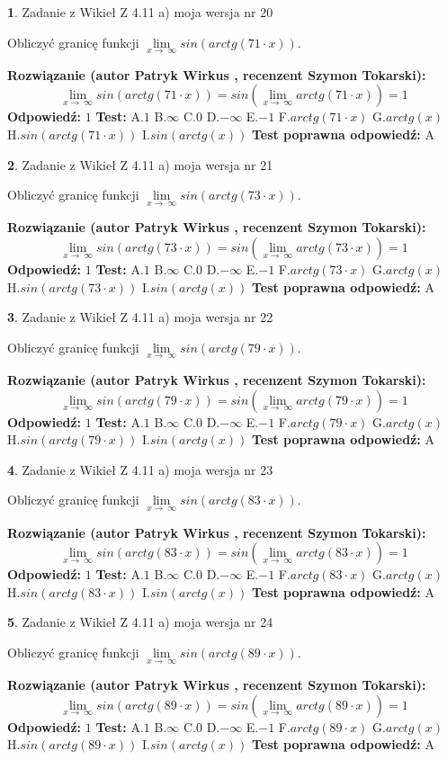 \documentclass[12pt, a4paper]{article}
\theoremstyle{definition} %
\newtheorem{zad}{}
\newcommand{\zadStart}[1]{\begin{zad}#1\newline}
\newcommand{\zadStop}{\end{zad}}
\newcommand{\rozwStart}[2]{\noindent \textbf{Rozwiązanie (autor #1 , recenzent #2): }\newline}
\newcommand{\rozwStop}{\newline}
\newcommand{\odpStart}{\noindent \textbf{Odpowiedź:}\newline}
\newcommand{\odpStop}{\newline}
\newcommand{\testStart}{\noindent \textbf{Test:}\newline}
\newcommand{\testStop}{\newline}
\newcommand{\kluczStart}{\noindent \textbf{Test poprawna odpowiedź:}\newline}
\newcommand{\kluczStop}{\newline}
\begin{document}
\zadStart{Zadanie z Wikieł Z 4.11 a) moja wersja nr 20}

Obliczyć granicę funkcji  $\lim\limits_{x\to\ \infty}sin(arctg(71\cdot x))$.
\zadStop
\rozwStart{Patryk Wirkus}{Szymon Tokarski}
$$\lim\limits_{x\to\ \infty}sin(arctg(71\cdot x)) = sin(\lim\limits_{x\to\ \infty}arctg(71\cdot x)) = 1$$
\rozwStop
\odpStart
$1$
\odpStop
\testStart
A.$1$ B.$\infty$ C.$0$ D.$-\infty$ E.$-1$
F.$arctg(71\cdot x)$ G.$arctg(x)$
H.$sin(arctg(71\cdot x))$
I.$sin(arctg(x))$
\testStop
\kluczStart
A
\kluczStop



\zadStart{Zadanie z Wikieł Z 4.11 a) moja wersja nr 21}

Obliczyć granicę funkcji  $\lim\limits_{x\to\ \infty}sin(arctg(73\cdot x))$.
\zadStop
\rozwStart{Patryk Wirkus}{Szymon Tokarski}
$$\lim\limits_{x\to\ \infty}sin(arctg(73\cdot x)) = sin(\lim\limits_{x\to\ \infty}arctg(73\cdot x)) = 1$$
\rozwStop
\odpStart
$1$
\odpStop
\testStart
A.$1$ B.$\infty$ C.$0$ D.$-\infty$ E.$-1$
F.$arctg(73\cdot x)$ G.$arctg(x)$
H.$sin(arctg(73\cdot x))$
I.$sin(arctg(x))$
\testStop
\kluczStart
A
\kluczStop



\zadStart{Zadanie z Wikieł Z 4.11 a) moja wersja nr 22}

Obliczyć granicę funkcji  $\lim\limits_{x\to\ \infty}sin(arctg(79\cdot x))$.
\zadStop
\rozwStart{Patryk Wirkus}{Szymon Tokarski}
$$\lim\limits_{x\to\ \infty}sin(arctg(79\cdot x)) = sin(\lim\limits_{x\to\ \infty}arctg(79\cdot x)) = 1$$
\rozwStop
\odpStart
$1$
\odpStop
\testStart
A.$1$ B.$\infty$ C.$0$ D.$-\infty$ E.$-1$
F.$arctg(79\cdot x)$ G.$arctg(x)$
H.$sin(arctg(79\cdot x))$
I.$sin(arctg(x))$
\testStop
\kluczStart
A
\kluczStop



\zadStart{Zadanie z Wikieł Z 4.11 a) moja wersja nr 23}

Obliczyć granicę funkcji  $\lim\limits_{x\to\ \infty}sin(arctg(83\cdot x))$.
\zadStop
\rozwStart{Patryk Wirkus}{Szymon Tokarski}
$$\lim\limits_{x\to\ \infty}sin(arctg(83\cdot x)) = sin(\lim\limits_{x\to\ \infty}arctg(83\cdot x)) = 1$$
\rozwStop
\odpStart
$1$
\odpStop
\testStart
A.$1$ B.$\infty$ C.$0$ D.$-\infty$ E.$-1$
F.$arctg(83\cdot x)$ G.$arctg(x)$
H.$sin(arctg(83\cdot x))$
I.$sin(arctg(x))$
\testStop
\kluczStart
A
\kluczStop



\zadStart{Zadanie z Wikieł Z 4.11 a) moja wersja nr 24}

Obliczyć granicę funkcji  $\lim\limits_{x\to\ \infty}sin(arctg(89\cdot x))$.
\zadStop
\rozwStart{Patryk Wirkus}{Szymon Tokarski}
$$\lim\limits_{x\to\ \infty}sin(arctg(89\cdot x)) = sin(\lim\limits_{x\to\ \infty}arctg(89\cdot x)) = 1$$
\rozwStop
\odpStart
$1$
\odpStop
\testStart
A.$1$ B.$\infty$ C.$0$ D.$-\infty$ E.$-1$
F.$arctg(89\cdot x)$ G.$arctg(x)$
H.$sin(arctg(89\cdot x))$
I.$sin(arctg(x))$
\testStop
\kluczStart
A
\kluczStop
\end{document}
